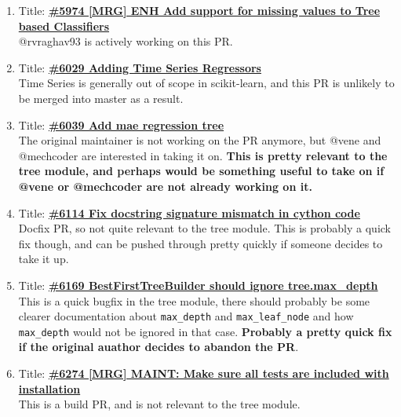 \documentclass[12pt, oneside]{article}
\begin{document}
\begin{enumerate}
  \item
  Title:
  \textbf{\href{https://github.com/scikit-learn/scikit-learn/pull/5974}
    {\#5974 [MRG] ENH Add support for missing values to Tree based Classifiers}}\\
  @rvraghav93 is actively working on this PR.

  \item
  Title:
  \textbf{\href{https://github.com/scikit-learn/scikit-learn/pull/6029}
    {\#6029 Adding Time Series Regressors}}\\
  Time Series is generally out of scope in scikit-learn, and this PR
  is unlikely to be merged into master as a result.

  \item
  Title:
  \textbf{\href{https://github.com/scikit-learn/scikit-learn/pull/6039}
    {\#6039 Add mae regression tree}}\\
  The original maintainer is not working on the PR anymore, but @vene
  and @mechcoder are interested in taking it on. \textbf{This is
    pretty relevant to the tree module, and perhaps would be something
  useful to take on if @vene or @mechcoder are not already working on it.}

  \item
  Title:
  \textbf{\href{https://github.com/scikit-learn/scikit-learn/pull/6114}
    {\#6114 Fix docstring signature mismatch in cython code}}\\
  Docfix PR, so not quite relevant to the tree module. This is
  probably a quick fix though, and can be pushed through pretty
  quickly if someone decides to take it up.

  \item
  Title:
  \textbf{\href{https://github.com/scikit-learn/scikit-learn/pull/6169}
    {\#6169 BestFirstTreeBuilder should ignore tree.max\_depth}}\\
  This is a quick bugfix in the tree module, there should probably be
  some clearer documentation about \texttt{max\_depth} and
  \texttt{max\_leaf\_node} and how \texttt{max\_depth} would not be
  ignored in that case. \textbf{Probably a pretty quick fix if the
    original auathor decides to abandon the PR}. 

  \item
  Title:
  \textbf{\href{https://github.com/scikit-learn/scikit-learn/pull/6274}
    {\#6274 [MRG] MAINT: Make sure all tests are included with installation}}\\
  This is a build PR, and is not relevant to the tree module.


\end{enumerate}
\end{document}
